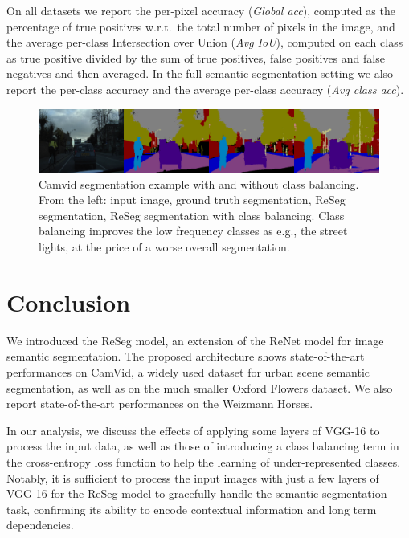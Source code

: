 On all datasets we report the per-pixel accuracy (\emph{Global acc}), computed
as the percentage of true positives w.r.t.\ the total number of pixels in the
image, and the average per-class Intersection over Union (\emph{Avg IoU}),
computed on each class as true positive divided by the sum of true positives,
false positives and false negatives and then averaged. In the full semantic
segmentation setting we also report the per-class accuracy and the average
per-class accuracy (\emph{Avg class acc}).

\begin{figure}[t]
    \centering
    \includegraphics[width=\textwidth]{img/camvid_classbal_diff.png}%
    \caption{Camvid segmentation example with and without class balancing. From
        the left: input image, ground truth segmentation, ReSeg segmentation,
        ReSeg segmentation with class balancing. Class balancing improves the
        low frequency classes as e.g., the street lights, at the price of a
        worse overall segmentation.}
    \label{fig:camvid_class_balance}
\end{figure}

\section{Conclusion}
We introduced the ReSeg model, an extension of the ReNet model for image
semantic segmentation. The proposed architecture shows state-of-the-art
performances on CamVid, a widely used dataset for urban scene semantic
segmentation, as well as on the much smaller Oxford Flowers dataset. We also
report state-of-the-art performances on the Weizmann Horses.

In our analysis, we discuss the effects of applying some layers of VGG-16 to
process the input data, as well as those of introducing a class balancing
term in the cross-entropy loss function to help the learning of
under-represented classes.
Notably, it is sufficient to process the input images with just a few layers of
VGG-16 for the ReSeg model to gracefully handle the semantic segmentation task, confirming
its ability to encode contextual information and long term dependencies.
